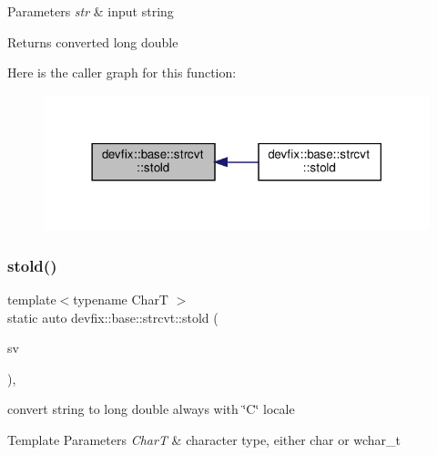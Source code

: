 \begin{DoxyParams}{Parameters}
{\em str} & input string \\
\hline
\end{DoxyParams}
\begin{DoxyReturn}{Returns}
converted long double 
\end{DoxyReturn}
Here is the caller graph for this function\+:\nopagebreak
\begin{figure}[H]
\begin{center}
\leavevmode
\includegraphics[width=318pt]{structdevfix_1_1base_1_1strcvt_a387c5ad278f568abb921df0ebac489c3_icgraph}
\end{center}
\end{figure}
\mbox{\label{structdevfix_1_1base_1_1strcvt_acd3c558da236cbab738a9014df5979ac}} 
\subsubsection{\texorpdfstring{stold()}{stold()}\hspace{0.1cm}{\footnotesize\ttfamily [2/2]}}
{\footnotesize\ttfamily template$<$typename CharT $>$ \\
static auto devfix\+::base\+::strcvt\+::stold (\begin{DoxyParamCaption}\item[{std\+::basic\+\_\+string\+\_\+view$<$ CharT $>$}]{sv }\end{DoxyParamCaption})\hspace{0.3cm}{\ttfamily [inline]}, {\ttfamily [static]}}



convert string to long double always with \char`\"{}\+C\char`\"{} locale 


\begin{DoxyTemplParams}{Template Parameters}
{\em CharT} & character type, either \textquotesingle{}char\textquotesingle{} or \textquotesingle{}wchar\+\_\+t\textquotesingle{} \\
\hline
\end{DoxyTemplParams}


